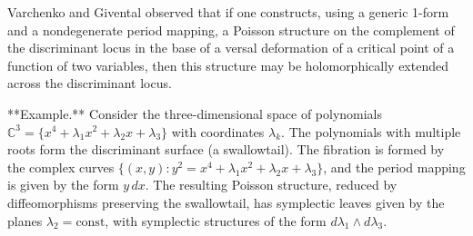 Varchenko and Givental observed that if one constructs, using a generic 1-form and a nondegenerate period mapping, a Poisson structure on the complement of the discriminant locus in the base of a versal deformation of a critical point of a function of two variables, then this structure may be holomorphically extended across the discriminant locus.

**Example.** Consider the three-dimensional space of polynomials $\mathbb{C}^3 = \{x^4 + \lambda_1 x^2 + \lambda_2 x + \lambda_3\}$ with coordinates $\lambda_k$. The polynomials with multiple roots form the discriminant surface (a swallowtail). The fibration is formed by the complex curves $\{(x, y): y^2 = x^4 + \lambda_1 x^2 + \lambda_2 x + \lambda_3\}$, and the period mapping is given by the form $y \, dx$. The resulting Poisson structure, reduced by diffeomorphisms preserving the swallowtail, has symplectic leaves given by the planes $\lambda_2 = \text{const}$, with symplectic structures of the form $d\lambda_1 \wedge d\lambda_3$.
